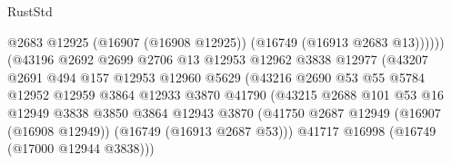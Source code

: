 \begin{lexlean}{RustStd}
\begin{coremodule}
                                              @2683
                                              @12925
                                              (@16907 (@16908 @12925))
                                              (@16749 (@16913 @2683 @13))))))
                                      (@43196
                                        @2692
                                        @2699
                                        @2706
                                        @13
                                        @12953
                                        @12962
                                        @3838
                                        @12977
                                        (@43207
                                          @2691
                                          @494
                                          @157
                                          @12953
                                          @12960
                                          @5629
                                          (@43216
                                            @2690
                                            @53
                                            @55
                                            @5784
                                            @12952
                                            @12959
                                            @3864
                                            @12933
                                            @3870
                                            @41790
                                            (@43215
                                              @2688
                                              @101
                                              @53
                                              @16
                                              @12949
                                              @3838
                                              @3850
                                              @3864
                                              @12943
                                              @3870
                                              (@41750
                                                @2687
                                                @12949
                                                (@16907 (@16908 @12949))
                                                (@16749 (@16913 @2687 @53)))
                                              @41717
                                              @16998
                                              (@16749 (@17000 @12944 @3838)))

\end{coremodule}
\end{lexlean}
